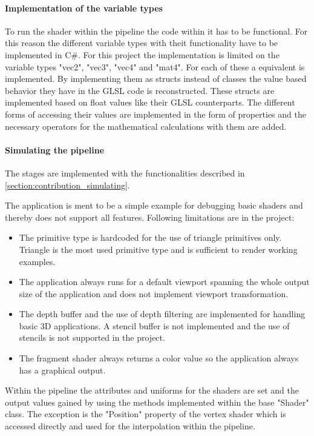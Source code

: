 \paragraph{Implementation of the variable types}

To run the shader within the pipeline the code within it has to be functional. For this reason the different variable types with theit functionality have to be implemented in C\#. For this project the implementation is limited on the variable types "vec2", "vec3", "vec4" and "mat4". For each of these a equivalent is implemented. By implementing them as structs instead of classes the value based behavior they have in the GLSL code is reconstructed. These structs are implemented based on float values like their GLSL counterparts. The different forms of accessing their values are implemented in the form of properties and the necessary operators for the mathematical calculations with them are added.

\paragraph{Simulating the pipeline}

The stages are implemented with the functionalities described in \autoref{section:contribution_simulating}.

The application is ment to be a simple example for debugging basic shaders and thereby does not support all features. Following limitations are in the project:
\begin{itemize}
\item The primitive type is hardcoded for the use of triangle primitives only. Triangle is the most used primitive type and is sufficient to render working examples.
\item The application always runs for a default viewport spanning the whole output size of the application and does not implement viewport transformation.
\item The depth buffer and the use of depth filtering are implemented for handling basic 3D applications. A stencil buffer is not implemented and the use of stencils is not supported in the project.
\item The fragment shader always returns a color value so the application always has a graphical output.
\end{itemize}

Within the pipeline the attributes and uniforms for the shaders are set and the output values gained by using the methods implemented within the base "Shader" class. The exception is the "Position" property of the vertex shader which is accessed directly and used for the interpolation within the pipeline.

